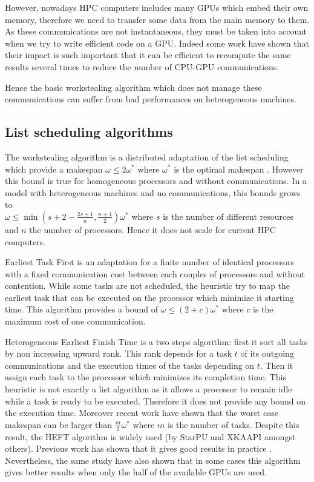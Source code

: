 \documentclass[10pt, conference, compsocconf,pdftex,dvipsnames]{IEEEtran}
\begin{document}
However, nowadays HPC computers includes many GPUs which embed their own
memory, therefore we need to transfer some data from the main memory
to them. As these communications are not instantaneous, they must be taken
into account when we try to write efficient code on a GPU.  Indeed some work
\cite{venkatasubramanian2009tuned} have shown that their impact is such
important that it can be efficient to recompute the same results several
times to reduce the number of CPU-GPU communications.  

Hence the basic workstealing algorithm which does not manage these
communications can suffer from bad performances on heterogeneous machines. 

\subsection{List scheduling algorithms}

The workstealing algorithm is a distributed adaptation of the list scheduling
which provide a makespan $\omega\leq2\omega^*$ where $\omega^*$ is the optimal
makespan \cite{GrahamRL1966Bounds, GrahamRL1969Bounds}. However this bound is
true for homogeneous processors and without communications. In a model with
heterogeneous machines and no communications, this bounds grows to\\
$\omega\leq\min(s+2-\frac{2s+1}{n},\frac{n+1}{2})\omega^*$ where $s$ is the
number of different resources and $n$ the number of processors. Hence it
does not scale for current HPC computers. 

Earliest Task First\cite{hwang1989scheduling} is an adaptation for a finite
number of identical processors with a fixed communication cost between each
couples of processors and without contention. While some tasks are not
scheduled, the heuristic try to map the earliest task that can be executed on
the processor which minimize it starting time. This algorithm provides a bound
of $\omega\leq(2+c)\omega^*$ where $c$ is the maximum cost of one
communication.  

Heterogeneous Earliest Finish Time \cite{topcuoglu2002performance}  is a two
steps algorithm: first it sort all tasks by non increasing upward rank. This
rank depends for a task $t$ of its outgoing communications and the execution
times of the tasks depending on $t$. Then it assign each task to the processor
which minimizes its completion time. This heuristic is not exactly a list
algorithm as it allows a processor to remain idle while a task is ready to be
executed. Therefore it does not provide any bound on the execution time.
Moreover recent work \cite{Kedad-SidhoumMonnaMounieEtAl2013} have shown that
the worst case makespan can be larger than $\frac{m}{2}\omega^*$ where $m$ is
the number of tasks. Despite this result, the HEFT algorithm is widely used
(by StarPU and XKAAPI amongst others). Previous work has shown that it gives
good results in practice \cite{ferreiralima:hal-00735470}. Nevertheless, the
same study have also shown that in some cases this algorithm gives better
results when only the half of the available GPUs are used.
\end{document}
